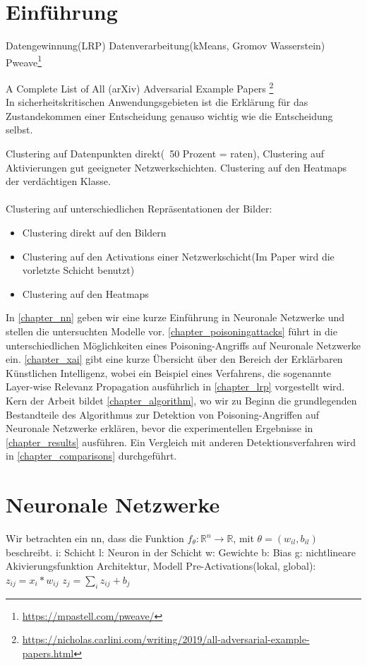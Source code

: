 \documentclass[11pt,a4paper]{article}
\numberwithin{equation}{section}
\begin{document}
	\section{Einführung}
	Datengewinnung(LRP)
	Datenverarbeitung(kMeans, Gromov Wasserstein)
	Pweave\footnote{\url{https://mpastell.com/pweave/}}
	
	A Complete List of All (arXiv) Adversarial Example Papers \footnote{\url{https://nicholas.carlini.com/writing/2019/all-adversarial-example-papers.html}}
	\\
	In sicherheitskritischen Anwendungsgebieten ist die Erklärung für das Zustandekommen einer Entscheidung genauso wichtig wie die Entscheidung selbst\cite{LRP_DNN}.
	
	Clustering auf Datenpunkten direkt(~50 Prozent = raten), Clustering auf Aktivierungen gut geeigneter Netzwerkschichten. Clustering auf den Heatmaps der verdächtigen Klasse.\\
	\\
	
	Clustering auf unterschiedlichen Repräsentationen der Bilder:
	\begin{itemize}
		\item Clustering direkt auf den Bildern\\
		\item Clustering auf den Activations einer Netzwerkschicht(Im Paper \cite{AC} wird die vorletzte Schicht benutzt)
		\item Clustering auf den Heatmaps
	\end{itemize}
	In \autoref{chapter_nn} geben wir eine kurze Einführung in Neuronale Netzwerke und stellen die untersuchten Modelle vor. \autoref{chapter_poisoningattacks} führt in die unterschiedlichen Möglichkeiten eines Poisoning-Angriffs auf Neuronale Netzwerke ein. \autoref{chapter_xai} gibt eine kurze Übersicht über den Bereich der Erklärbaren Künstlichen Intelligenz, wobei ein Beispiel eines Verfahrens, die sogenannte Layer-wise Relevanz Propagation ausführlich in \autoref{chapter_lrp} vorgestellt wird. Kern der Arbeit bildet \autoref{chapter_algorithm}, wo wir zu Beginn die grundlegenden Bestandteile des Algorithmus zur Detektion von Poisoning-Angriffen auf Neuronale Netzwerke erklären, bevor die experimentellen Ergebnisse in \autoref{chapter_results} ausführen. Ein Vergleich mit anderen Detektionsverfahren wird in \autoref{chapter_comparisons} durchgeführt.
	\section{Neuronale Netzwerke} \label{chapter_nn}
	Wir betrachten ein \gls{nn}, dass die Funktion $f_{\theta}:\mathbb{R}^n \to\mathbb{R}$, mit $\theta = (w_{il}, b_{il})$ beschreibt. 
	i: Schicht
	l: Neuron in der Schicht
	w: Gewichte 
	b: Bias
	g: nichtlineare Akivierungsfunktion
	Architektur,
	Modell
	Pre-Activations(lokal, global): $z_{ij} = x_i*w_{ij}$
	$z_j = \sum_iz_{ij} + b_j$
	
\end{document}
